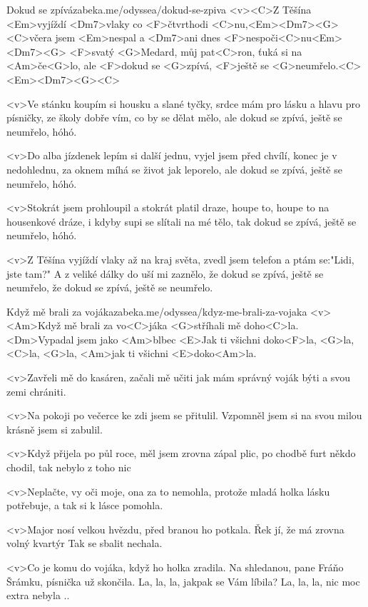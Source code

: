 \begin{song}{46}{Dokud se zpívá}{zabeka.me/odyssea/dokud-se-zpiva}
<v><C>Z Těšína <Em>vyjíždí <Dm7>vlaky co <F>čtvrthodi <C>nu,<Em><Dm7><G>
<C>včera jsem <Em>nespal a <Dm7>ani dnes <F>nespoči<C>nu<Em><Dm7><G>
<F>svatý <G>Medard, můj pat<C>ron, ťuká si na <Am>če<G>lo,
ale <F>dokud se <G>zpívá, <F>ještě se <G>neumřelo.<C><Em><Dm7><G><C>

<v>Ve stánku koupím si housku a slané tyčky,
srdce mám pro lásku a hlavu pro písničky,
ze školy dobře vím, co by se dělat mělo,
ale dokud se zpívá, ještě se neumřelo, hóhó. 


<v>Do alba jízdenek lepím si další jednu,
vyjel jsem před chvílí, konec je v nedohlednu,
za oknem míhá se život jak leporelo,
ale dokud se zpívá, ještě se neumřelo, hóhó. 


<v>Stokrát jsem prohloupil a stokrát platil draze,
houpe to, houpe to na housenkové dráze,
i kdyby supi se slítali na mé tělo,
tak dokud se zpívá, ještě se neumřelo, hóhó. 

<v>Z Těšína vyjíždí vlaky až na kraj světa,
zvedl jsem telefon a ptám se:"Lidi, jste tam?"
A z veliké dálky do uší mi zaznělo,
že dokud se zpívá, ještě se neumřelo,
že dokud se zpívá, ještě se neumřelo.
\end{song}
\begin{song}{47}{Když mě brali za vojáka}{zabeka.me/odyssea/kdyz-me-brali-za-vojaka}
<v><Am>Když mě brali za vo<C>jáka
<G>stříhali mě doho<C>la.
<Dm>Vypadal jsem jako <Am>blbec
<E>Jak ti všichni doko<F>la, 
<G>la, <C>la, <G>la, <Am>jak ti všichni <E>doko<Am>la.

<v>Zavřeli mě do kasáren, 
začali mě učiti
jak mám správný voják býti
a svou zemi chrániti.

<v>Na pokoji po večerce 
ke zdi jsem se přitulil.
Vzpomněl jsem si na svou milou
krásně jsem si zabulil.

<v>Když přijela po půl roce,
měl jsem zrovna zápal plic,
po chodbě furt někdo chodil,
tak nebylo z toho nic

<v>Neplačte, vy oči moje,
ona za to nemohla,
protože mladá holka lásku potřebuje,
a tak si k lásce pomohla.

<v>Major nosí velkou hvězdu,
před branou ho potkala.
Řek jí, že má zrovna volný kvartýr
Tak se sbalit nechala.

<v>Co je komu do vojáka,
když ho holka zradila.
Na shledanou, pane Fráňo Šrámku,
písnička už skončila.
La, la, la, jakpak se Vám líbila?
La, la, la, nic moc extra nebyla .. 
\end{song}
